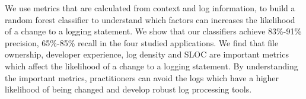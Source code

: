 We use metrics that are calculated from context and log information, to build a random forest classifier to understand which factors can increases the likelihood of a change to a logging statement. We show that our classifiers achieve 83\%-91\% precision, 65\%-85\% recall in the four studied applications. We find that file ownership, developer experience, log density and SLOC are important metrics which affect the likelihood of a change to a logging statement. By understanding the important metrics, practitioners can avoid the logs which have a higher likelihood of being changed and develop robust log processing tools.






 
 
